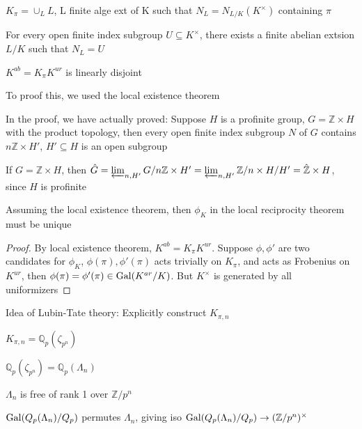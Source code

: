 \documentclass[main]{subfiles}
\begin{document}
$K_\pi=\cup_LL$, L finite alge ext of K such that $N_L=N_{L/K}(K^\times)$ containing $\pi$

\begin{theorem}
For every open finite index subgroup $U\subseteq K^\times$, there exists a finite abelian extsion $L/K$ such that $N_L=U$
\end{theorem}

$K^{ab}=K_\pi K^{ur}$ is linearly disjoint

\begin{remark}
To proof this, we used the local existence theorem
\end{remark}

In the proof, we have actually proved: Suppose $H$ is a profinite group, $G=\mathbb Z\times H$ with the product topology, then every open finite index subgroup $N$ of $G$ contains $n\mathbb Z\times H'$, $H'\subseteq H$ is an open subgroup

\begin{corollary}
If $G=\mathbb Z\times H$, then $\hat G=\varprojlim_{n,H'}G/n\mathbb Z\times H'=\varprojlim_{n,H'}\mathbb Z/n\times H/H'=\hat{\mathbb Z}\times H$, since $H$ is profinite
\end{corollary}

\begin{theorem}
Assuming the local existence theorem, then $\phi_K$ in the local reciprocity theorem must be unique
\end{theorem}

\begin{proof}
By local existence theorem, $K^{ab}=K_\pi K^{ur}$. Suppose $\phi,\phi'$ are two candidates for $\phi_K$, $\phi(\pi),\phi'(\pi)$ acts trivially on $K_\pi$, and acts as Frobenius on $K^{ur}$, then $\phi(\pi)=\phi'(\pi)\in\operatorname{Gal}(K^{ar}/K)$. But $K^\times$ is generated by all uniformizers
\end{proof}

Idea of Lubin-Tate theory: Explicitly construct $K_{\pi,n}$

$K_{\pi,n}=\mathbb Q_p(\zeta_{p^n})$

$\mathbb Q_p(\zeta_{p^n})=\mathbb Q_p(\Lambda_n)$

$\Lambda_n$ is free of rank 1 over $\mathbb Z/p^n$

$\operatorname{Gal}(Q_p(\Lambda_n)/Q_p)$ permutes $\Lambda_n$, giving iso $\operatorname{Gal}(Q_p(\Lambda_n)/Q_p)\to(\mathbb Z/p^n)^\times$
\end{document}
